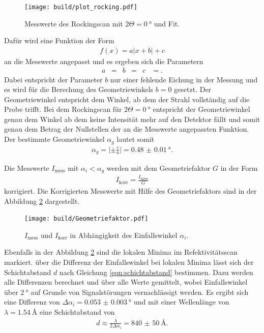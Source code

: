\begin{figure}
  \centering
  \texttt{[image: build/plot\_rocking.pdf]}
  \caption{Messwerte des Rockingscan mit $2\Theta = \SI{0}{\degree}$ und Fit.}
  \label{fig:rock_scan_0}
\end{figure}

Dafür wird eine Funktion der Form
\begin{align}
  f(x) = a \lvert x + b \rvert + c
\end{align}
an die Messwerte angepasst und es ergeben sich die Parametern
\begin{align}
a&= &b&=  &c&=.
\end{align}
Dabei entspricht der Parameter $b$ nur einer fehlende Eichung in der Messung und
es wird für die Berechung des Geometriewinkels $b=0$ gesetzt.
Der Geometriewinkel entspricht dem Winkel, ab dem der Strahl
vollständig auf die Probe trifft. Bei dem Rockingscan für $2\Theta=\SI{0}{\degree}$
entspricht der Geometriewinkel genau dem Winkel ab dem keine Intensität
mehr auf den Detektor fällt und somit genau dem Betrag der Nullstellen der an die Messwerte
angepassten Funktion.
Der bestimmte Geometriewinkel $\alpha_g$
lautet somit
\begin{align}
\alpha_g = \lvert \pm\frac{c}{a} \rvert = \SI{0.48(1)}{\degree}.
\end{align}


Die Messwerte $I_{\mathrm{mess}}$ mit $\alpha_i < \alpha_g $ werden mit dem Geometriefaktor $G$
in der Form
\begin{align}
  I_{\mathrm{korr}} = \frac{I_{\mathrm{mess}}}{G}
\end{align}
korrigiert. Die Korrigierten Messwerte mit Hilfe des Geometriefaktors sind in der Abbildung \ref{fig:korr} dargestellt.
\begin{figure}
  \centering
  \texttt{[image: build/Geometriefaktor.pdf]}
  \caption{$I_{\mathrm{mess}}$ und $I_{\mathrm{korr}}$ in Abhängigkeit des Einfallswinkel $\alpha_i$.}
  \label{fig:korr}
\end{figure}

Ebenfalls in der Abbildung \ref{fig:korr}
sind die lokalen Minima im Refektivitätsscan markiert.
über die Differenz der Einfallswinkel bei lokalen Minima lässt
sich der Schichtabstand $d$ nach Gleichung \eqref{eqn:schichtabstand}
bestimmen.
Dazu werden alle Differenzen
berechnet und über alle Werte gemittelt, wobei Einfallswinkel
über $\SI{2}{\degree}$ auf Grunde von Signalstörungen vernachlässigt werden.
Es ergibt sich eine Differenz von $\Delta \alpha_i = \SI{0.053(3)}{\degree}$
und mit einer Wellenlänge von $\lambda=\SI{1.54}{\angstrom}$
eine Schichtabstand von
\begin{align}
d \approx \frac{\lambda}{2\Delta\alpha_i} = \SI{840(50)}{\angstrom}.
\end{align}

